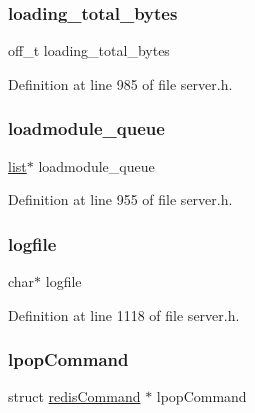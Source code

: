 \subsubsection{\texorpdfstring{loading\+\_\+total\+\_\+bytes}{loading\_total\_bytes}}
{\footnotesize\ttfamily off\+\_\+t loading\+\_\+total\+\_\+bytes}



Definition at line 985 of file server.\+h.

\mbox{\label{structredis_server_aa5a12ada98b21efbafa6a3068581ac76}} 
\subsubsection{\texorpdfstring{loadmodule\+\_\+queue}{loadmodule\_queue}}
{\footnotesize\ttfamily \hyperlink{structlist}{list}$\ast$ loadmodule\+\_\+queue}



Definition at line 955 of file server.\+h.

\mbox{\label{structredis_server_a539bec706ac5acbbdef66f363a7a2524}} 
\subsubsection{\texorpdfstring{logfile}{logfile}}
{\footnotesize\ttfamily char$\ast$ logfile}



Definition at line 1118 of file server.\+h.

\mbox{\label{structredis_server_aa67bd29148b6d1ad47541e9e40b7cb82}} 
\subsubsection{\texorpdfstring{lpop\+Command}{lpopCommand}}
{\footnotesize\ttfamily struct \hyperlink{structredis_command}{redis\+Command} $\ast$ lpop\+Command}



